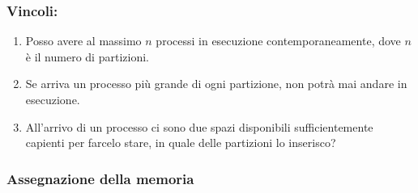 \documentclass[a4paper,12pt, twoside]{report}
\begin{document}
\subsubsection{Vincoli:}
\begin{enumerate}
    \item Posso avere al massimo $n$ processi in esecuzione contemporaneamente, dove $n$ \`e 
        il numero di partizioni.
    \item Se arriva un processo pi\`u grande di ogni partizione, non potr\`a mai 
        andare in esecuzione. 
    \item All'arrivo di un processo ci sono due spazi disponibili sufficientemente capienti
        per farcelo stare, in quale delle partizioni lo inserisco?
\end{enumerate}

\subsubsection{Assegnazione della memoria}
\end{document}
